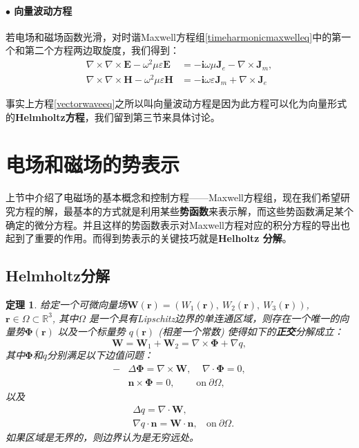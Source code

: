\documentclass[10pt,reqno, final]{ctexart}
\newtheorem{theorem}{定理}[section]
\begin{document}
\paragraph{$\bullet$ 向量波动方程} 若电场和磁场函数光滑，对时谐Maxwell方程组\eqref{timeharmonicmaxwelleq}中的第一个和第二个方程两边取旋度，我们得到：
\begin{equation}\label{vectorwaveeq}
\begin{split}
\nabla\times\nabla\times \bm{E} -\omega^2\mu\varepsilon \bm{E}&=-\bm{i}\omega\mu\bm{J}_e -\nabla\times \bm{J}_m,\\
\nabla\times\nabla\times \bm{H} - \omega^2\mu\varepsilon \bm{H}&=-\bm{i}\omega\varepsilon \bm{J}_m+\nabla \times \bm{J}_e
\end{split}
\end{equation}

事实上方程\eqref{vectorwaveeq}之所以叫向量波动方程是因为此方程可以化为向量形式的\textbf{Helmholtz方程}，我们留到第三节来具体讨论。

\section{电场和磁场的势表示}
上节中介绍了电磁场的基本概念和控制方程——Maxwell方程组，现在我们希望研究方程的解，最基本的方式就是利用某些\textbf{势函数}来表示解，而这些势函数满足某个确定的微分方程。并且这样的势函数表示对Maxwell方程对应的积分方程的导出也起到了重要的作用。而得到势表示的关键技巧就是\textbf{Helholtz 分解}。

\subsection{Helmholtz分解}
\begin{theorem}\label{helholtzdecom}
给定一个可微向量场$\bm{W}(\bm{r}) = (W_1(\bm{r}),\ W_2(\bm{r}),\ W_3(\bm{r}))$, $\bm{r}\in\Omega\subset \mathbb{R}^3$, 其中$\Omega$ 是一个具有Lipschitz边界的单连通区域，则存在一个唯一的向量势$\bm{\Phi}(\bm{r})$ 以及一个标量势 $q(\bm{r})$ (相差一个常数) 使得如下的\textbf{正交}分解成立：
\begin{equation}\label{decom}
\bm{W} = \bm{W}_1+\bm{W}_2 = \nabla\times \bm{\Phi}+\nabla q,
\end{equation}
其中$\bm{\Phi}$和$q$分别满足以下边值问题：
\begin{equation}\label{phi}
\begin{split}
-&\Delta \bm{\Phi} = \nabla\times \bm{W},\ \ \ \ \ \nabla\cdot \bm{\Phi}=0,\\
&\bm{n}\times\bm{\Phi}= 0,\ \ \ \ \ \ \ \ \ \ \mathrm{on}\ \partial\Omega,
\end{split}
\end{equation}
以及
\begin{equation}\label{q}
\begin{split}
&\Delta q = \nabla\cdot\bm{W},\\
&\nabla q\cdot\bm{n} = \bm{W}\cdot \bm{n},\ \ \ \  \mathrm{on}\ \partial\Omega.
\end{split}
\end{equation}
如果区域是无界的，则边界认为是无穷远处。
\end{theorem}
\end{document}
